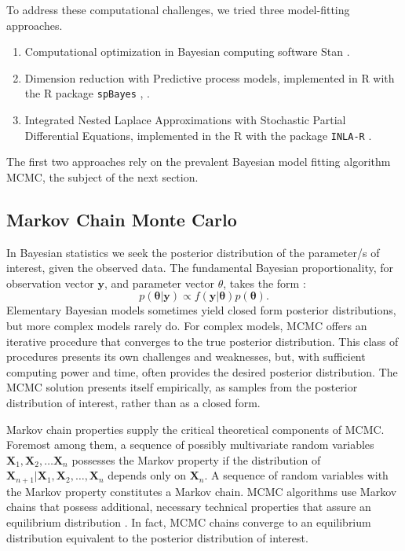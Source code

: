 To address these computational challenges, we tried three model-fitting approaches.
\begin{enumerate}
\item Computational optimization in Bayesian computing software Stan \citep{RSTAN}.
\item Dimension reduction with Predictive process models, implemented in R with the R package \verb|spBayes| \citep{Eidsvik2012}, \citep{Finley2013}.
\item Integrated Nested Laplace Approximations with Stochastic Partial Differential Equations, implemented in the R with the package \verb|INLA-R| \citep{Lindgren2015}.
\end{enumerate}
The first two approaches rely on the prevalent Bayesian model fitting algorithm  MCMC, the subject of the next section.

\subsection{Markov Chain Monte Carlo}

In Bayesian statistics we seek the posterior distribution of the parameter/s of interest, given the observed data. The fundamental Bayesian proportionality, for observation vector $\pmb{y}$, and parameter vector $\theta$, takes the form \citep{Gelman2014}:
\begin{equation} \label{eq:bayes}
p(\pmb{\theta}|\pmb{y}) \propto f(\pmb{y}|\pmb{\theta})p(\pmb{\theta}).
\end{equation}
Elementary Bayesian models sometimes yield closed form posterior distributions, but more complex models rarely do. For complex models, MCMC offers an iterative procedure that converges to the true posterior distribution. This class of procedures presents its own challenges and weaknesses, but, with sufficient computing power and time, often provides the desired posterior distribution. The MCMC solution presents itself empirically, as samples from the posterior distribution of interest, rather than as a closed form. 

Markov chain properties supply the critical theoretical components of MCMC. Foremost among them, a sequence of possibly multivariate random variables $\pmb{X}_{1}, \pmb{X}_{2}, \hdots \pmb{X}_{n}$ possesses the Markov property if the distribution of $\pmb{X}_{n+1}|\pmb{X}_{1}, \pmb{X}_{2}, \hdots , \pmb{X}_{n}$ depends only on $\pmb{X}_{n}$. A sequence of random variables with the Markov property constitutes a Markov chain. MCMC algorithms use Markov chains that possess additional, necessary technical properties that assure an equilibrium distribution \citep{Brooks2011}. In fact, MCMC chains converge to an equilibrium distribution equivalent to the posterior distribution of interest.

